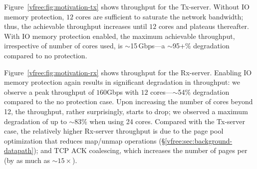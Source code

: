 Figure~\ref{vfree:fig:motivation-tx} shows throughput for the Tx-server.
Without IO memory protection, $12$ cores are sufficient to saturate the network bandwidth; thus, the achievable throughput increases until $12$ cores and plateaus thereafter.
With IO memory protection enabled, the maximum achievable throughput, 
  irrespective of number of cores used, 
  is ${\sim}$15\,Gbps---a ${\sim}$95+\% degradation 
  compared to no protection.

Figure~\ref{vfree:fig:motivation-rx} shows throughput for the Rx-server.
Enabling IO memory protection again results in significant degradation in throughput: we observe a peak throughput of $160$Gbps with $12$ cores---{$\sim$}54\% degradation compared to the no protection case. 
Upon increasing the number of cores beyond 12, the throughput, rather surprisingly, 
  starts to drop; we observed a maximum degradation of up to $\sim$83\% when using 24 cores. 
Compared with the Tx-server case, the relatively higher Rx-server throughput is due to the page pool optimization that reduces map/unmap operations (\S\ref{vfree:sec:background-datapath}); and TCP ACK coalescing, which increases the number of pages 
  per  (by as much as ${\sim}15\times$).


